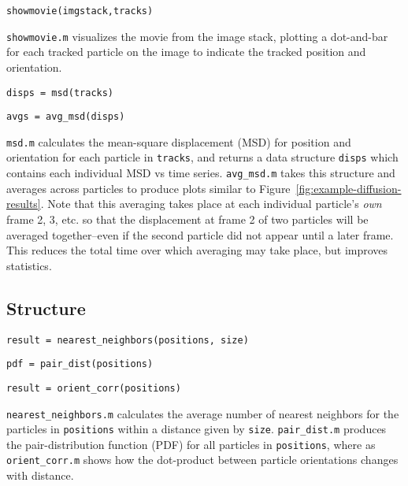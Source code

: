 \texttt{showmovie(imgstack,tracks)}

\texttt{showmovie.m} visualizes the
movie from the image stack, plotting a dot-and-bar for each tracked particle on the image to indicate 
the tracked position and orientation.

\texttt{disps = msd(tracks)}

\texttt{avgs = avg\_msd(disps)}

\texttt{msd.m} calculates the mean-square displacement (MSD) for position and orientation for each particle 
in \texttt{tracks}, and returns a data structure \texttt{disps} which contains each individual MSD vs time 
series.  \texttt{avg\_msd.m} takes this structure and averages across particles to produce plots similar 
to Figure~\ref{fig:example-diffusion-results}. Note that this averaging takes place at each 
individual particle's \textit{own} frame 2, 3, etc. so that the displacement at frame 2 of two particles 
will be averaged together--even if the second particle did not appear until a later frame.  This reduces the
total time over which averaging may take place, but improves statistics.

\subsection{Structure}
\label{sec:structure-calcs}

\texttt{result = nearest\_neighbors(positions, size)}

\texttt{pdf = pair\_dist(positions)}

\texttt{result = orient\_corr(positions)}

\texttt{nearest\_neighbors.m} calculates the average number of nearest neighbors for the particles in 
\texttt{positions} within a distance given by \texttt{size}. \texttt{pair\_dist.m} produces the pair-distribution
function (PDF) for all particles in \texttt{positions}, where as \texttt{orient\_corr.m} shows how the 
dot-product between particle orientations changes with distance.

